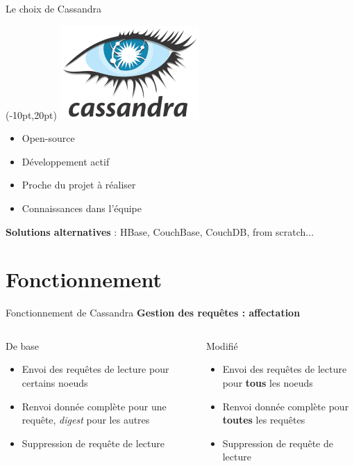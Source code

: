 \documentclass{beamer}
\newcommand{\success}{\color{SuccessGreen}\CheckmarkBold}
\begin{document}
\begin{frame}{Le choix de Cassandra}
\begin{textblock*}{\paperwidth}(-10pt,20pt)
    \raggedleft \includegraphics[scale=0.2]{cassandra_logo}
\end{textblock*}
\begin{itemize}
	\item Open-source
	\item Développement actif
	\item Proche du projet à réaliser
	\item Connaissances dans l'équipe
\end{itemize}
\textbf{Solutions alternatives} : HBase, CouchBase, CouchDB, from scratch...
\end{frame}

\section{Fonctionnement}

\begin{frame}{Fonctionnement de Cassandra}
\textbf{Gestion des requêtes : affectation}
\begin{columns}
\begin{column}[c]{5cm}
\begin{block}{De base}
\begin{itemize}
	\item Envoi des requêtes de lecture pour certains noeuds
	\item Renvoi donnée complète pour une requête, \textit{digest} pour les autres
	\item Suppression de requête de lecture 
\end{itemize}
\end{block}
\end{column}

\begin{column}[c]{5cm}
\begin{block}{Modifié}
\begin{itemize}
	\item[\success] Envoi des requêtes de lecture pour \textbf{tous} les noeuds
	\item[\success] Renvoi donnée complète pour \textbf{toutes} les requêtes
	\item[\success] Suppression de requête de lecture 
\end{itemize}
\end{block}
\end{column}
\end{columns}
\end{frame}
\end{document}
